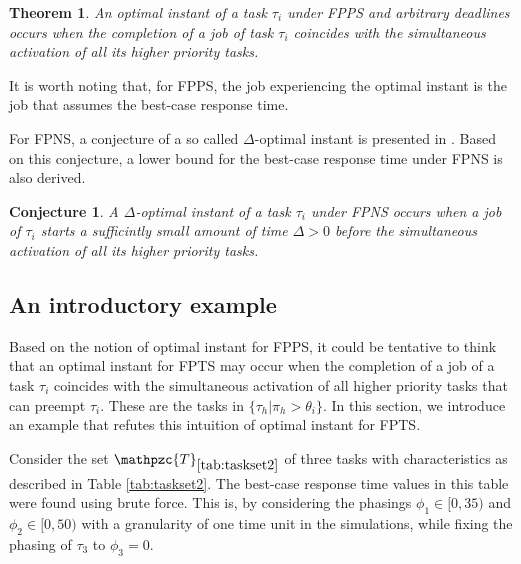 \documentclass[conference,compsoc]{IEEEtran}
\newtheorem{theorem}{Theorem}
\newtheorem{conjecture}{Conjecture}
\begin{document}
\begin{theorem}
	An optimal instant of a task $\tau_i$ under FPPS and arbitrary deadlines occurs when the completion of a job of task $\tau_i$ coincides with the simultaneous activation of all its higher priority tasks. 
\end{theorem}

It is worth noting that, for FPPS, the job experiencing the optimal instant is the job that assumes the best-case response time.

For FPNS, a conjecture of a so called $\Delta$-optimal instant is presented in \cite{BV05}. Based on this conjecture, a lower bound for the best-case response time under FPNS is also derived.

\begin{conjecture}
	A $\Delta$-optimal instant of a task $\tau_i$ under FPNS occurs when a job of $\tau_i$ starts a sufficintly small amount of time $\Delta > 0$ before the simultaneous activation of all its higher priority tasks.
\end{conjecture} 

\subsection{An introductory example}

Based on the notion of optimal instant for FPPS, it could be tentative to think that an optimal instant for FPTS may occur when the completion of a job of a task $\tau_i$ coincides with the simultaneous activation of all higher priority tasks that can preempt $\tau_i$. These are the tasks in $\{\tau_h | \pi_h > \theta_i \}$. In this section, we introduce an example that refutes this intuition of optimal instant for FPTS.


Consider the set $\mathpzc{T}_{\ref{tab:taskset2}}$ of three tasks with characteristics as described in Table \ref{tab:taskset2}. The best-case response time values in this table were found using brute force. This is, by considering the phasings $\phi_1 \in [0,35)$ and $\phi_2 \in [0,50)$ with a granularity of one time unit in the simulations, while fixing the phasing of $\tau_3$ to $\phi_3 = 0$.
\end{document}
